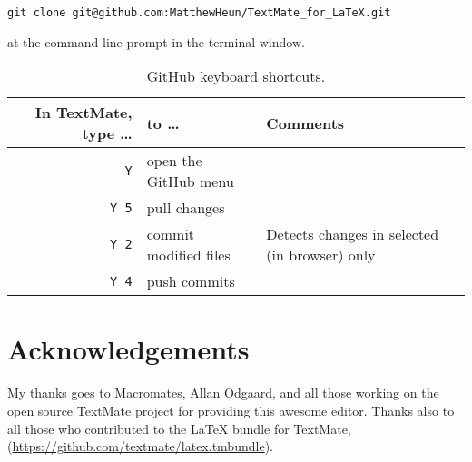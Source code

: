 \documentclass[10pt]{article}
\begin{document}
\verb!git clone git@github.com:MatthewHeun/TextMate_for_LaTeX.git!

\noindent at the command line prompt in the terminal window.

\begin{table}
\centering
\caption{GitHub keyboard shortcuts.}
\begin{tabular}{r|l|l}
	In TextMate, type \dots & to \dots      & Comments                                       \\
	\hline
	\cmdkey\texttt{Y}           & open the GitHub menu            &                          \\
	\cmdkey\texttt{Y 5}         & pull changes                    &                          \\
	\cmdkey\texttt{Y 2}         & commit modified files           & Detects changes in selected (in browser) only \\
	\cmdkey\texttt{Y 4}         & push commits                    &                          \\
\end{tabular}
\label{tab:github_keyboard_shortcuts}
\end{table}



\section*{Acknowledgements} %
\label{sec:acknowledgements}

My thanks goes to Macromates, Allan Odgaard, and all those working 
on the open source TextMate project for providing this awesome editor.
Thanks also to all those who contributed to the \LaTeX{} bundle for TextMate,
(\url{https://github.com/textmate/latex.tmbundle}).






\end{document}
